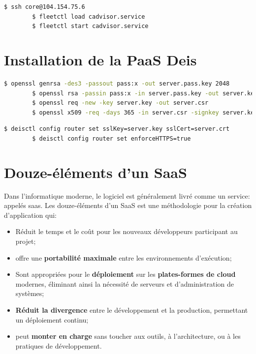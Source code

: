 	\begin{lstlisting}[language=bash,caption=Lancement des services]
		$ ssh core@104.154.75.6 
		$ fleetctl load cadvisor.service
		$ fleetctl start cadvisor.service
	\end{lstlisting}



\chapter{Installation de la PaaS Deis}

	\begin{lstlisting}[language=bash,caption=Génération de la clé privée eet la certificat]
		$ openssl genrsa -des3 -passout pass:x -out server.pass.key 2048
		$ openssl rsa -passin pass:x -in server.pass.key -out server.key
		$ openssl req -new -key server.key -out server.csr
		$ openssl x509 -req -days 365 -in server.csr -signkey server.key -out server.crt
	\end{lstlisting}

	\begin{lstlisting}[language=bash,caption=Activation du protocole SSL]
		$ deisctl config router set sslKey=server.key sslCert=server.crt
		$ deisctl config router set enforceHTTPS=true
	\end{lstlisting}	

\chapter{Douze-éléments d'un SaaS}


Dans l'informatique moderne, le logiciel est généralement livré comme un service: appelés \acrshort{saas}. Les douze-éléments d'un SaaS est une méthodologie pour la création d'application qui:

\begin{itemize}
	\item Réduit le temps et le coût pour les nouveaux développeurs participant au projet;
	\item offre une \textbf{portabilité maximale} entre les environnements d'exécution;
	\item Sont appropriées pour le \textbf{déploiement} sur les \textbf{plates-formes de cloud} modernes, éliminant ainsi la nécessité de serveurs et d'administration de systèmes;
	\item \textbf{Réduit la divergence} entre le développement et la production, permettant un déploiement continu;
	\item peut \textbf{monter en charge} sans toucher aux outils, à l'architecture, ou à les pratiques de développement.
\end{itemize}


